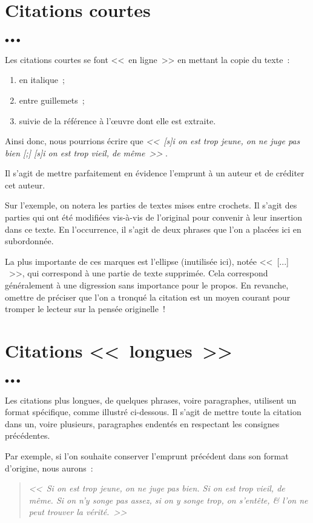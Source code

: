 \documentclass[11pt, french, screen, research-development]{report-rd-info}
\newenvironment{explanation}
{\color{blue}
 \begin{list}{}{\hspace{0.2\textwidth}\color{blue}}\item $\bullet\bullet\bullet$
}
{\end{list}}
\begin{document}
\section{Citations courtes}

\begin{explanation}
   Les citations courtes se font <<~en ligne~>> en mettant la copie du texte~:
   \begin{enumerate}
      \item en italique~;
      \item entre guillemets~;
      \item suivie de la référence à l'\oe uvre dont elle est extraite.
   \end{enumerate}

   Ainsi donc, nous pourrions écrire que \emph{<<~[s]i on est trop jeune, on ne juge pas bien [;] [s]i on est trop vieil, de même~>>} \cite{Pascal-1671}.

   Il s'agit de mettre parfaitement en évidence l'emprunt à un auteur et de créditer cet auteur.

   \bigskip

   Sur l'exemple, on notera les parties de textes mises entre crochets.
   Il s'agit des parties qui ont été modifiées vis-à-vis de l'original pour convenir à leur insertion dans ce texte.
   En l'occurrence, il s'agit de deux phrases que l'on a placées ici en subordonnée.

   La plus importante de ces marques est l'ellipse (inutilisée ici), notée <<~[...] ~>>, qui correspond à une partie de texte supprimée.
   Cela correspond généralement à une digression sans importance pour le propos.
   En revanche, omettre de préciser que l'on a tronqué la citation est un moyen courant pour tromper le lecteur sur la pensée originelle~!
\end{explanation}

\section{Citations <<~longues~>>}

\begin{explanation}
   Les citations plus longues, de quelques phrases, voire paragraphes, utilisent un format spécifique, comme illustré ci-dessous.
   Il s'agit de mettre toute la citation dans un, voire plusieurs, paragraphes endentés en respectant les consignes précédentes.

   Par exemple, si l'on souhaite conserver l'emprunt précédent dans son format d'origine, nous aurons~:
   \begin{quote}
      \emph{<<~Si on est trop jeune, on ne juge pas bien.
      Si on est trop vieil, de même.
      Si on n'y songe pas assez, si on y songe trop, on s'entête, \& l'on ne peut trouver la vérité.~>>} \cite{Pascal-1671}
   \end{quote}
\end{explanation}
\end{document}
